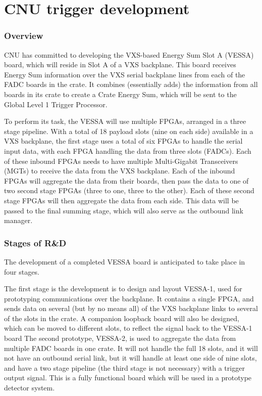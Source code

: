 \documentclass[10pt]{article}
\begin{document}
\section*{CNU trigger development}


\subsubsection*{Overview}

	CNU has committed to developing the VXS-based Energy Sum Slot A (VESSA) board, 
which will reside in Slot A of a VXS backplane.  This board receives Energy Sum 
information over the VXS serial backplane lines from each of the FADC boards in the crate.  
It combines (essentially adds) the information from all boards in its crate to create 
a Crate Energy Sum, which will be sent to the Global Level 1 Trigger Processor.

	To perform its task, the VESSA will use multiple FPGAs, arranged in a three 
stage pipeline.  With a total of 18 payload slots (nine on each side) available in a 
VXS backplane, the first stage uses a total of six FPGAs to handle the 
serial input data, with each FPGA handling the data from three slots (FADCs).  Each 
of these inbound FPGAs needs to have  multiple Multi-Gigabit Transceivers (MGTs) to 
receive the data from the VXS backplane.  Each of the inbound FPGAs will aggregate the data from their 
boards, then pass the data to one of two second stage FPGAs (three to one, 
three to the other).  Each of these second stage FPGAs will then aggregate the 
data from each side.  This data will be passed to the final summing stage, which 
will also serve as the outbound link manager.


\subsubsection*{Stages of  R\&D}

	The development of a completed VESSA board is anticipated to take place in four stages.

	The first stage is the development is to design and layout VESSA-1, used 
for prototyping communications over the backplane.  It contains a single FPGA, and 
sends data on several (but by no means all) of the VXS backplane links to several of 
the slots in the crate.  A companion loopback board will also be designed, which can 
be moved to different slots, to reflect the signal back to the VESSA-1 board
The second prototype, VESSA-2, is used to aggregate the data from multiple FADC boards 
in one crate.  It will not handle the full 18 slots, and it will not have an outbound 
serial link, but it will handle at least one side of nine slots, and have a two stage 
pipeline (the third stage is not necessary) with a trigger output signal.  This is a 
fully functional board which will be used in a prototype detector system.
\end{document}
